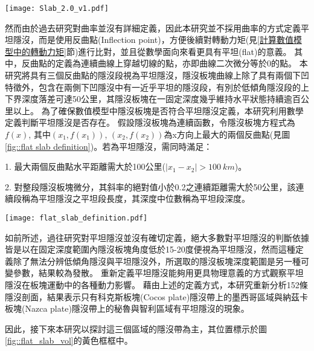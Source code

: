 \begin{figure*}[ht!]
    \centering
    \texttt{[image: Slab\_2.0\_v1.pdf]}
    \caption[slab 2.0 模型與四條參考剖面，改編自\citealp{schellart2020control}]{slab 2.0 模型與四條參考剖面，改編自\citealp{schellart2020control}。其中(a)為馬尼拉隱沒帶剖面，(b)為阿拉斯加隱沒帶剖面，(c)為加勒比板塊隱沒帶剖面，(d)為秘魯隱沒帶剖面。}
    \label{fig::slab profile}
\end{figure*}


然而由於過去研究對曲率並沒有詳細定義，因此本研究並不採用曲率的方式定義平坦隱沒，而是使用反曲點(Inflection point)，方便後續對轉動力矩(見\ref{計算數值模型中的轉動力矩}節)進行比對，並且從數學面向來看更具有平坦(flat)的意義。
其中，反曲點的定義為連續曲線上穿越切線的點，亦即曲線二次微分等於0的點。
本研究將具有三個反曲點的隱沒段視為平坦隱沒，隱沒板塊曲線上除了具有兩個下凹特徵外，包含在兩側下凹隱沒中有一近乎平坦的隱沒段，有別於低傾角隱沒段的上下界深度落差可達50公里，其隱沒板塊在一固定深度幾乎維持水平狀態持續逾百公里以上。
為了確保數值模型中隱沒板塊是否符合平坦隱沒定義，本研究利用數學定義判斷平坦隱沒是否存在。
假設隱沒板塊為連續函數，令隱沒板塊方程式為$f(x)$, 其中$(x_{1},f(x_{1}))$, $(x_{2},f(x_{2}))$為x方向上最大的兩個反曲點(見圖\ref{fig::flat slab definition})。若為平坦隱沒，需同時滿足：

1. 最大兩個反曲點水平距離需大於100公里($\mid x_{1}-x_{2}\mid > 100 \ km$)。

2. 對整段隱沒板塊微分，其斜率的絕對值小於0.2之連續距離需大於50公里，該連續段稱為平坦隱沒之平坦段長度，其深度中位數稱為平坦段深度。

\begin{figure*}[ht!]
    \centering
    \texttt{[image: flat\_slab\_definition.pdf]}
    \caption[本研究中平坦隱沒的定義示意圖。]{本研究中平坦隱沒的定義示意圖。}
    \label{fig::flat slab definition}
\end{figure*}

如前所述，過往研究對平坦隱沒並沒有確切定義，絕大多數對平坦隱沒的判斷依據皆是以在固定深度範圍內隱沒板塊角度低於15-20度便視為平坦隱沒，然而這種定義除了無法分辨低傾角隱沒與平坦隱沒外，所選取的隱沒板塊深度範圍是另一種可變參數，結果較為發散。
重新定義平坦隱沒能夠用更具物理意義的方式觀察平坦隱沒在板塊運動中的各種動力影響。
藉由上述的定義方式，本研究重新分析152條隱沒剖面，結果表示只有科克斯板塊(Cocos plate)隱沒帶上的墨西哥區域與納茲卡板塊(Nazca plate)隱沒帶上的秘魯與智利區域有平坦隱沒的現象。

因此，接下來本研究以探討這三個區域的隱沒帶為主，其位置標示於圖\ref{fig::flat_slab_vol}的黃色框框中。

